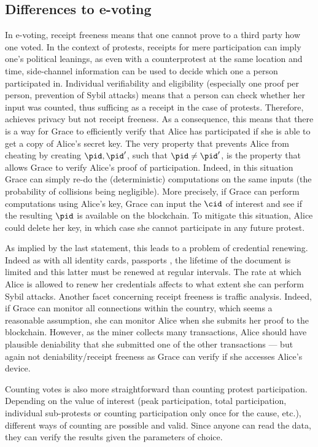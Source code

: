 \subsection{Differences to e-voting}

In e-voting, receipt freeness means that one cannot prove to a third party how one voted. 
In the context of protests, receipts for mere participation can imply one's political leanings, as even with a counterprotest at the same location and time, side-channel information can be used to decide which one a person participated in. 
Individual verifiability and eligibility (especially one proof per person, prevention of Sybil attacks) means that a person can check whether her input was counted, thus sufficing as a receipt in the case of protests.  
Therefore, \PRIVO achieves privacy but not receipt freeness.
As a consequence, this means that there is a way for Grace to efficiently verify that Alice has participated if she is able to get a copy of Alice's secret key. 
The very property that prevents Alice from cheating by creating \(\pid, \pid'\), such that \(\pid \neq \pid'\), is the property that
allows Grace to verify Alice's proof of participation.  
Indeed, in this situation Grace can simply re-do the (deterministic) computations on the same inputs (the probability of collisions being negligible).  
More precisely, if Grace can perform computations using Alice's key, Grace can input the \(\cid\) of interest and see if the resulting \(\pid\) is available on the blockchain.  
To mitigate this situation, Alice could delete her key, in which case she cannot participate in any future protest.  

As implied by the last statement, this leads to a problem of credential renewing.  
Indeed as with all identity cards, passports \etc, the lifetime of the document is limited and this latter must be renewed at regular intervals.  
The rate at which Alice is allowed to renew her credentials affects to what extent she can perform Sybil attacks. 
Another facet concerning receipt freeness is traffic analysis. 
Indeed, if Grace can monitor all connections within the country, which seems a reasonable assumption, she can monitor Alice when she submits her proof to the blockchain. 
However, as the miner collects many transactions, Alice should have plausible deniability that she submitted one of the other transactions --- but again not deniability/receipt freeness as Grace can verify if she accesses Alice's device.

Counting votes is also more straightforward than counting protest participation. 
Depending on the value of interest (\eg peak participation, total participation, individual sub-protests or counting participation only once for the cause, etc.), different ways of counting are
possible and valid. 
Since anyone can read the data, they can verify the results given the parameters of choice.

